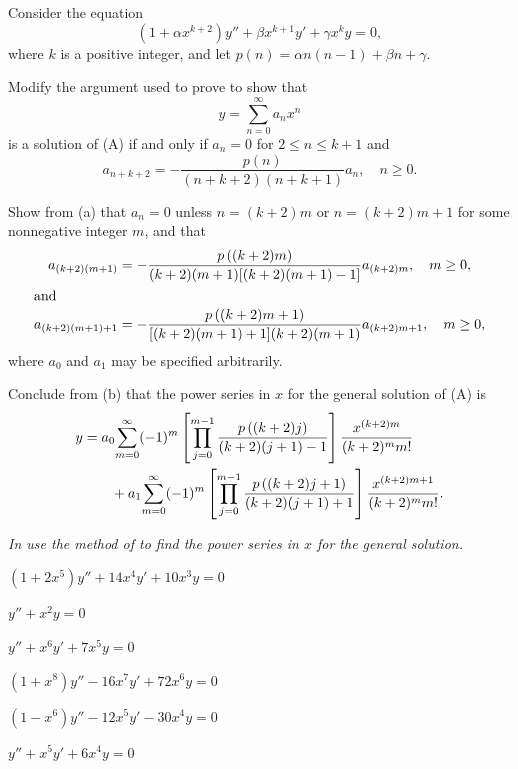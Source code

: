 \begin{exerciselist}
\item\label{exer:7.2.38}Consider the equation
\[
\left(1+\alpha x^{k+2}\right)y''+\beta x^{k+1}y'+\gamma x^ky=0,
\tag{A}
\]
where $k$ is a positive integer,
and let
$p(n)=\alpha n(n-1)+\beta n+\gamma$.
\begin{alist}
\item %
Modify the argument used to prove  to show that
\[
y=\sum_{n=0}^\infty a_nx^n
\]
  is a solution of
(A)  if and only if  $a_n=0$ for $2\le n\le k+1$ and
\[
a_{n+k+2}=-\frac{p(n)}{(n+k+2)(n+k+1)}a_n,\quad n\ge0.
\]
\item %
Show from (a)  that $a_n=0$  unless $n=(k+2)m$  or $n=(k+2)m+1$
for some nonnegative integer $m$, and that
\begin{align*}
a_{(k+2)(m+1)}&=-\frac{p\left((k+2)m\right)}{(k+2)(m+1)[(k+2)(m+1)-1]}a_{(k+2)m},\quad m\ge
0, \\
\shortintertext{and}
a_{(k+2)(m+1)+1}&=-\frac{p\left((k+2)m+1\right)}{[(k+2)(m+1)+1](k+2)(m+1)}
a_{(k+2)m+1},\quad m\ge0,
\end{align*}
where $a_0$ and $a_1$ may be specified arbitrarily.
\item %
Conclude from (b)  that the  power series in $x$ for the general
solution
of (A) is
\begin{align*}
y&=a_0\displaystyle{\sum^\infty_{m=0}(-1)^m \left[\prod^{m-1}_{j=0}
\frac{p\left((k+2)j\right)}{(k+2)(j+1)-1}\right]\frac{x^{(k+2)m}}{(k+2)^m
m!}}\\
&\qquad{}+a_1\displaystyle{\sum^\infty_{m=0}(-1)^m
\left[\prod^{m-1}_{j=0}\frac{p\left((k+2)j+1\right)}{(k+2)(j+1)+1}\right]
\frac{x^{(k+2)m+1}}{(k+2)^mm!}}.
\end{align*}
\end{alist}
\end{exerciselist}
%
\textsl{In   use the method of
  to find the power series in $x$
 for the general solution.}
\begin{exerciselistTwoColumn}
\item\label{exer:7.2.39}$(1+2x^5)y''+14x^4y'+10x^3y=0$
\item\label{exer:7.2.40}$y''+x^2y=0$ %
\item\label{exer:7.2.41}$y''+x^6y'+7x^5y=0$
\item\label{exer:7.2.42}$(1+x^8)y''-16x^7y'+72x^6y=0$
\item\label{exer:7.2.43}$(1-x^6)y''-12x^5y'-30x^4y=0$
\item\label{exer:7.2.44}$y''+x^5y'+6x^4y=0$

\end{exerciselistTwoColumn}


